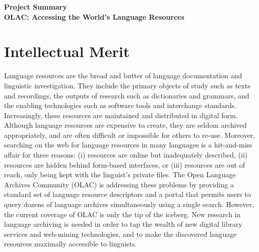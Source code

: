 \documentclass[11pt]{nsf}
\begin{document}
\begin{center}\textbf{\Large
Project Summary\\[2ex]
    OLAC: Accessing the World's Language Resources
}\end{center}

\section*{Intellectual Merit}

%
%
Language resources are the bread and butter of
language documentation and linguistic investigation.
They include
the primary objects of study such as texts and recordings,
the outputs of research such as dictionaries and grammars,
and the enabling technologies such as software tools and interchange standards.
Increasingly, these resources are maintained and distributed in
digital form.
%
%
Although language resources are expensive to create,
they are seldom archived appropriately,
and are often difficult or impossible for others to re-use.
Moreover, searching on the web for language resources in many languages
is a hit-and-miss affair for three reasons:
(i) resources are online but inadequately described,
(ii) resources are hidden behind form-based interfaces, or
(iii) resources are out of reach, only being kept with the linguist's
private files.
%
%
The Open Language Archives Community (OLAC) is addressing these
problems by providing a standard set of language resource descriptors
and a portal that permits users to query dozens of language archives
simultaneously using a single search.  However, the current coverage
of OLAC is only the tip of the iceberg.  New research in language
archiving is needed in order to tap the wealth of
new digital library services and web-mining technologies, and
to make the discovered language resources maximally accessible to linguists.
\end{document}
